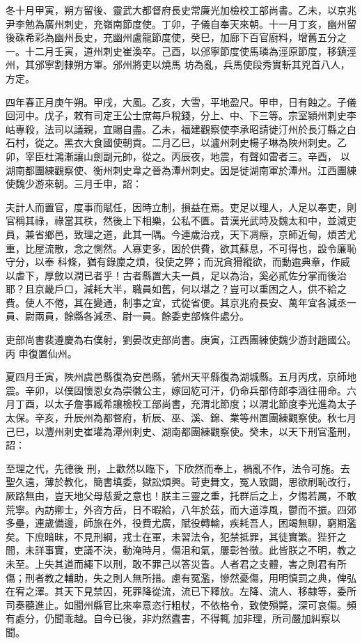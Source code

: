 \begin{pinyinscope}
 冬十月甲寅，朔方留後、靈武大都督府長史常廉光加檢校工部尚書。乙未，以京兆尹李勉為廣州刺史，充嶺南節度使。丁卯，子儀自奉天來朝。十一月丁亥，幽州留後硃希彩為幽州長史，充幽州盧龍節度使，癸巳，加廊下百官廚料，增舊五分之一。十二月壬寅，道州刺史崔渙卒。己酉，以邠寧節度使馬璘為涇原節度，移鎮涇州，其邠寧割隸朔方軍。邠州將吏以燒馬
 坊為亂，兵馬使段秀實斬其兇首八人，方定。



 四年春正月庚午朔。甲戌，大風。乙亥，大雪，平地盈尺。甲申，日有蝕之。子儀回河中。戊子，敕有司定王公士庶每戶稅錢，分上、中、下三等。宗室潁州刺史李岵專殺，法司以議親，宜賜自盡。乙未，福建觀察使李承昭請徙汀州於長汀縣之白石村，從之。黑衣大食國使朝貢。二月乙巳，以瀘州刺史楊子琳為陜州刺史。乙卯，宰臣杜鴻漸讓山劍副元帥，從之。丙辰夜，地震，有聲如雷者三。辛酉，
 以湖南都團練觀察使、衡州刺史韋之晉為潭州刺史。因是徙湖南軍於潭州。江西團練使魏少游來朝。三月壬申，詔：



 夫計人而置官，度事而賦任，因時立制，損益在焉。吏足以理人，人足以奉吏，則官稱其祿，祿當其秩，然後上下相樂，公私不匱。昔漢光武時及魏太和中，並減吏員，兼省鄉邑，致理之道，此其一隅。今連歲治戎，天下凋瘵，京師近甸，煩苦尤重，比屋流散，念之惻然。人寡吏多，困於供費，欲其蘇息，不可得也，設令廉恥守分，以奉
 科條，猶有錄廩之煩，役使之弊；而況貪猾縱欲，而動逾典章，作威以虐下，厚斂以潤已者乎！古者縣置大夫一員，足以為治，奚必貳佐分掌而後治耶？且京畿戶口，減耗大半，職員如舊，何以堪之？豈可以重困之人，供不給之費。使人不倦，其在變通，制事之宜，式從省便。其京兆府長安、萬年宜各減丞一員、尉兩員，餘縣各減丞、尉一員。餘委吏部條件處分。



 吏部尚書裴遵慶為右僕射，劉晏改吏部尚書。庚寅，江西團練使魏少游封趙國公。丙
 申復置仙州。



 夏四月壬寅，陜州虞邑縣復為安邑縣，虢州天平縣復為湖城縣。五月丙戌，京師地震。辛卯，以僕固懷恩女為崇徽公主，嫁回紇可汗，仍命兵部侍郎李涵往冊命。六月丁酉，以太子詹事臧希讓檢校工部尚書，充渭北節度；以渭北節度李光進為太子太保。辛亥，升辰州為都督府，析辰、巫、溪、錦、業等州置團練觀察使。秋七月己巳，以灃州刺史崔瓘為潭州刺史、湖南都團練觀察使。癸未，以天下刑官濫刑，詔：



 至理之代，先德後
 刑，上歡然以臨下，下欣然而奉上，禍亂不作，法令可施。去聖久遠，薄於教化，簡書填委，獄訟煩興。苛吏舞文，冤人致闢，思欲刷恥改行，厥路無由，豈天地父母慈愛之意也！朕主三靈之重，托群后之上，夕惕若厲，不敢荒寧。內訪卿士，外咨方岳，日不暇給，八年於茲，而大道淳風，鬱而不振。四郊多壘，連歲備邊，師旅在外，役費尤廣，賦役轉輸，疾耗吾人，困竭無聊，窮期濫矣。下庶暗昧，不見刑綱，戎士在軍，未習法令，犯禁抵罪，其徒實繁。狴犴之
 間，未詳事實，吏議不決，動淹時月，傷沮和氣，屢彰咎徵。此皆朕之不明，教之未至。上失其道而繩下以刑，敢不罪己以答災眚。人者君之支體，害之則君有所傷；刑者教之輔助，失之則人無所措。慮有冤濫，慘然憂傷，用明慎罰之典，俾弘在宥之澤。其天下見禁囚，死罪降從流，流已下釋放。左降、流人、移隸等，委所司奏聽進止。如聞州縣官比來率意恣行粗杖，不依格令，致使殞斃，深可哀傷。頻有處分，仍聞乖越。自今已後，非灼然蠹害，不得輒
 加非理，所司嚴加糾察以聞。




\end{pinyinscope}
